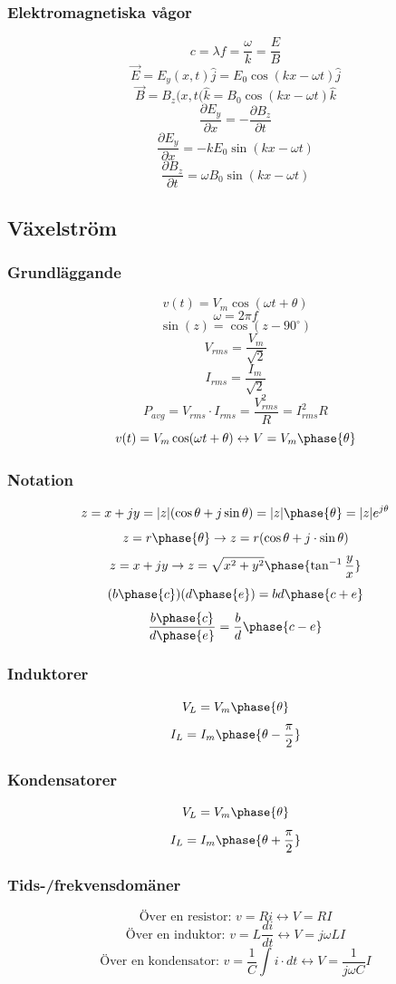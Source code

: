 \documentclass{article}
\begin{document}
\subsubsection{Elektromagnetiska vågor}
\[ c = \lambda f = \frac{\omega}{k} = \frac{E}{B} \]
\[ \vec{E} = E_y(x, t) \hat{j} = E_0 \cos(kx-\omega t) \hat{j} \]
\[ \vec{B} = B_z(x, t( \hat{k} = B_0 \cos(kx-\omega t) \hat{k} \]
\[ \frac{\partial E_y}{\partial x} = -\frac{\partial  B_z}{\partial t} \]
\[ \frac{\partial E_y}{\partial x}  = -kE_0 \sin(kx - \omega t) \]
\[ \frac{\partial B_z}{\partial t} = \omega B_0 \sin(kx-\omega t) \]

\subsection{Växelström}
\subsubsection{Grundläggande}
\[ v(t) = V_m \cos(\omega t + \theta) \]
\[ \omega = 2 \pi f \]
\[ \sin(z) = \cos(z - 90^\circ) \]
\[ V_{rms} = \frac{V_m}{\sqrt{2}} \]
\[ I_{rms} = \frac{I_m}{\sqrt{2}} \]
\[ P_{avg} = V_{rms} \cdot I_{rms} = \frac{V^2_{rms}}{R} = I^2_{rms} R \]
\[ v(t) = V_m \cos(\omega t + \theta) \leftrightarrow V = V_m \phase{\theta} \]

\subsubsection{Notation}
\[ z = x + jy = |z|(\cos \theta + j \sin \theta) = |z| \phase{\theta} = |z| e^{j \theta} \]
\[ z = r \phase{\theta} \rightarrow z = r( \cos \theta + j \cdot \sin \theta ) \]
\[ z = x + jy \rightarrow z = \sqrt{x^2 + y^2} \phase{ \tan^{-1} \frac{y}{x} } \]
\[ (b \phase{c})(d \phase{e}) = bd \phase{c+e} \]
\[ \frac{b \phase{c}}{d \phase{e}} = \frac{b}{d} \phase{c-e} \]

\subsubsection{Induktorer}
\[ V_L = V_m \phase{\theta} \]
\[ I_L = I_m \phase{\theta - \frac{\pi}{2}} \]

\subsubsection{Kondensatorer}
\[ V_L = V_m \phase{\theta} \]
\[ I_L = I_m \phase{\theta + \frac{\pi}{2}} \]

\subsubsection{Tids-/frekvensdomäner}
\[ \textrm{Över en resistor: } v = Ri \leftrightarrow V = RI \]
\[ \textrm{Över en induktor: } v = L \frac{di}{dt} \leftrightarrow V = j \omega LI \]
\[ \textrm{Över en kondensator: } v = \frac{1}{C} \int i \cdot dt \leftrightarrow V = \frac{1}{j \omega C}I \]
\end{document}

